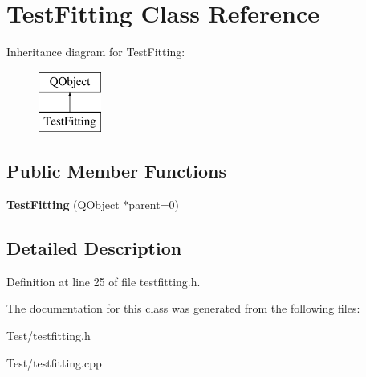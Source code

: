 \hypertarget{class_test_fitting}{}\section{Test\+Fitting Class Reference}
\label{class_test_fitting}
Inheritance diagram for Test\+Fitting\+:\begin{figure}[H]
\begin{center}
\leavevmode
\includegraphics[height=2.000000cm]{class_test_fitting}
\end{center}
\end{figure}
\subsection*{Public Member Functions}
\begin{DoxyCompactItemize}
\item 
{\bfseries Test\+Fitting} (Q\+Object $\ast$parent=0)\hypertarget{class_test_fitting_a3481611483414e5bd2a2fd837b90b527}{}\label{class_test_fitting_a3481611483414e5bd2a2fd837b90b527}

\end{DoxyCompactItemize}


\subsection{Detailed Description}


Definition at line 25 of file testfitting.\+h.



The documentation for this class was generated from the following files\+:\begin{DoxyCompactItemize}
\item 
Test/testfitting.\+h\item 
Test/testfitting.\+cpp\end{DoxyCompactItemize}
